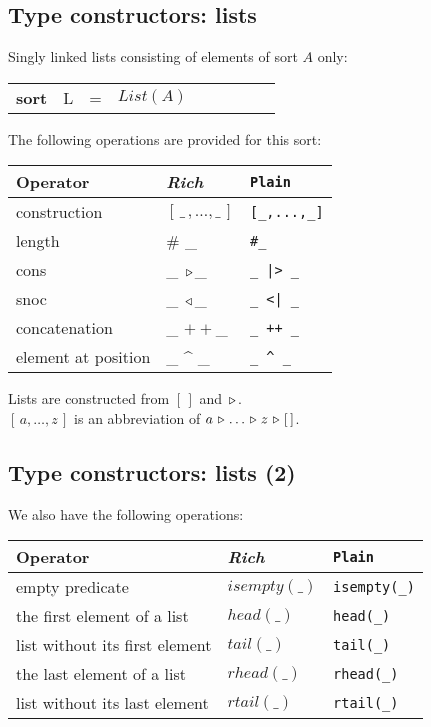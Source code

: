 \documentclass{article}
\makeatletter
\newcommand{\frm}[1]{\mbox{\ensuremath{#1}}}
\newcommand{\f}[1]{\ensuremath{\mathit{#1}}}
\newcommand{\fa}[2]{\ensuremath{\f{#1}(#2)}}
\newcommand{\lst}[1]{\ensuremath{[\,#1\,]}}
\newcommand{\el}{\ensuremath{[\,]}}
\newcommand{\cons}{\ensuremath{\hspace{0.12em}\triangleright\hspace{0.08em}}}
\newcommand{\snoc}{\ensuremath{\hspace{0.08em}\triangleleft\hspace{0.12em}}}
\newcommand{\concat}{\frm{+\!+}}
\newenvironment{mCRL2}%
{\par\bigskip\noindent%
 \begin{tabular}{@{}>{\bf}p{2.3em}L@{\ }L@{\ }L@{\ }L@{\ }L@{\ }L@{\ }L@{\ }L}%
}%
{\end{tabular}\bigskip\par%
}
\makeatother
\begin{document}
\begin{slidetop}
\section*{Type constructors: lists}

Singly linked lists consisting of elements of sort \frm{A} only:
\begin{mCRL2}
sort & L & = & \fa{List}{A}
\end{mCRL2}

\bigskip
The following operations are provided for this sort:
\begin{center}
\begin{tabular}{|l@{\qquad}L@{\qquad}l|}
\hline
Operator                       & \textit{Rich}          & \verb+Plain+\\\hline
construction                   & \lst{\_\,,\ldots,\_}   & \verb+[_,...,_]+\\
length                         & \# \_                  & \verb+#_+\\
cons                           & \_ \cons \_            & \verb+_ |> _+\\
snoc                           & \_ \snoc \_            & \verb+_ <| _+\\
concatenation                  & \_ \concat \_          & \verb-_ ++ _-\\
element at position            & \_ \mbox{\^{}} \_      & \verb+_ ^ _+\\
\hline
\end{tabular}
\end{center}

\bigskip
Lists are constructed from \frm{\el} and \frm{\cons}.\\
\frm{\lst{a, \ldots, z}} is an abbreviation of \frm{a \cons \ldots \cons z \cons \el}.
\end{slidetop}

\begin{slidetop}
\section*{Type constructors: lists (2)}

\bigskip
We also have the following operations:
\begin{center}
\begin{tabular}{|l@{\qquad}L@{\qquad}l|}
\hline
Operator                       & \textit{Rich}          & \verb+Plain+\\\hline
empty predicate                & \fa{isempty}{\_}       & \verb+isempty(_)+\\
the first element of a list    & \fa{head}{\_}          & \verb+head(_)+\\
list without its first element & \fa{tail}{\_}          & \verb+tail(_)+\\
the last element of a list     & \fa{rhead}{\_}         & \verb+rhead(_)+\\
list without its last element  & \fa{rtail}{\_}         & \verb+rtail(_)+\\
\hline
\end{tabular}
\end{center}
\end{slidetop}
\end{document}
